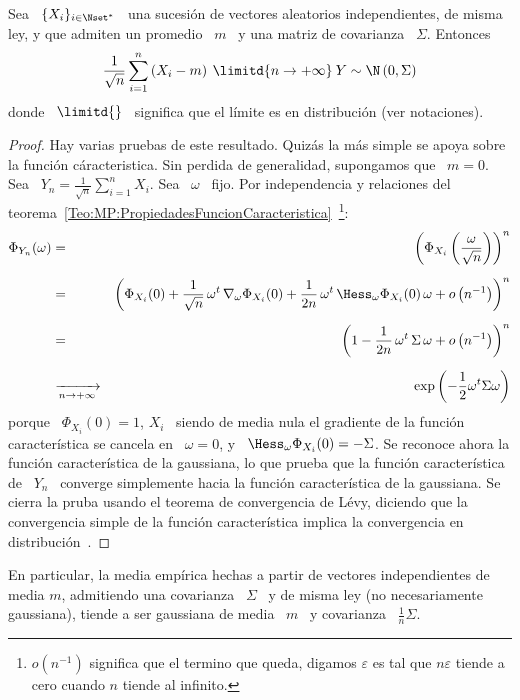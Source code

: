 \begin{teorema}\label{Teo:MP:CLT}
%
  Sea  \  $\{  X_i \}_{i  \in  \Nset^*}$  \  una  sucesi\'on de  vectores  aleatorios
  independientes, de misma ley,  y que admiten un promedio \ $m$  \ y una matriz
  de covarianza \ $\Sigma$. Entonces
  \[
  \frac{1}{\sqrt{n}}  \sum_{i=1}^n  \left( X_i  -  m  \right)  \: \limitd{n  \to
    +\infty} \: Y \sim \N\left( 0 , \Sigma \right)
  \]
  donde  \ $\limitd{}$ \  significa que  el l\'imite  es en  distribuci\'on (ver
  notaciones).
\end{teorema}
\begin{proof}
  Hay varias pruebas de este resultado.  Quiz\'as la m\'as simple se apoya sobre
  la funci\'on  c\'aracteristica.  Sin perdida de generalidad,  supongamos que \
  $m = 0$. Sea \ $\displaystyle Y_n = \frac{1}{\sqrt{n}} \sum_{i=1}^n X_i$.  Sea
  \    $\omega$    \    fijo.     Por    independencia    y    relaciones    del
  teorema~\ref{Teo:MP:PropiedadesFuncionCaracteristica}~\footnote{$o\left(
      n^{-1} \right)$ significa que  el termino que queda, digamos $\varepsilon$
    es tal que $n \varepsilon$ tiende a cero cuando $n$ tiende al infinito.}:
  \begin{eqnarray*}
  \Phi_{Y_n}(\omega) & = & \left( \Phi_{X_i}\left( \frac{\omega}{\sqrt{n}}
  \right) \right)^n\\[2mm]
& = & \left( \Phi_{X_i}(0) + \frac{1}{\sqrt{n}} \, \omega^t \, \nabla_\omega
  \Phi_{X_i}(0) + \frac{1}{2 n} \, \omega^t \, \Hess_\omega\Phi_{X_i}(0) \, \omega +
  o\left( n^{-1} \right) \right)^n\\[2mm]
  & = & \left( 1 - \frac{1}{2 n} \, \omega^t \, \Sigma \, \omega +
  o\left( n^{-1} \right) \right)^n\\[2mm]
  & \xrightarrow[n \to +\infty]{} & \exp\left( -\frac12 \omega^t \Sigma \omega \right)
  \end{eqnarray*}
  porque \ $\Phi_{X_i}(0) = 1$, $X_i$ \  siendo de media nula el gradiente de la
  funci\'on   caracter\'istica   se  cancela   en   \   $\omega   =  0$,   y   \
  $\Hess_\omega\Phi_{X_i}(0)  =  -  \Sigma$.   Se reconoce  ahora  la  funci\'on
  caracter\'istica   de  la   gaussiana,   lo  que   prueba   que  la   funci\'on
  caracter\'istica  de  \  $Y_n$  \  converge  simplemente  hacia  la  funci\'on
  caracter\'istica  de la gaussiana.   Se cierra  la pruba  usando el  teorema de
  convergencia de  L\'evy, diciendo que  la convergencia simple de  la funci\'on
  caracter\'istica  implica  la  convergencia en  distribuci\'on~\cite{AshDol99,
    Bil12, AthLah06}.
\end{proof}
%
En particular, la  media emp\'irica hechas a partir  de vectores independientes de
media  $m$,  admitiendo  una  covarianza  \  $\Sigma$  \  y  de  misma  ley  (no
necesariamente gaussiana), tiende a ser gaussiana  de media \ $m$ \ y covarianza \
$\frac{1}{n} \Sigma$.

